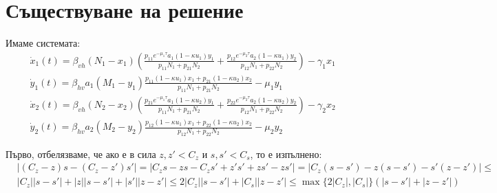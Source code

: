 \section{Съществуване на решение}
Имаме системата:
\begin{align*}
  &\dot{x}_1(t) = \beta_{vh} (N_1-x_1) \left(\frac{p_{11} e^{-\mu_1 \tau} a_1 (1-\kappa u_1) y_1}{p_{11} N_1 + p_{21} N_2} + \frac{p_{12} e^{-\mu_2 \tau} a_2 (1-\kappa u_1) y_2}{p_{12} N_1 + p_{22} N_2 }\right) - \gamma_1 x_1 \\
  &\dot{y}_1(t) = \beta_{hv} a_1 (M_1-y_1) \frac{p_{11} (1-\kappa u_1) x_1 + p_{21} (1-\kappa u_2) x_2}{p_{11} N_1 + p_{21} N_2} - \mu_1 y_1 \\
  &\dot{x}_2(t) = \beta_{vh} (N_2-x_2) \left(\frac{p_{21} e^{-\mu_1 \tau} a_1 (1-\kappa u_2) y_1}{p_{11} N_1 + p_{21} N_2 } + \frac{p_{22} e^{-\mu_2 \tau} a_2 (1-\kappa u_2) y_2}{p_{12} N_1 + p_{22} N_2}\right) - \gamma_2 x_2 \\
  &\dot{y}_2(t) = \beta_{hv} a_2 (M_2-y_2) \frac{p_{12} (1-\kappa u_1) x_1 +p_{22} (1-\kappa u_2) x_2}{p_{12} N_1 + p_{22} N_2} - \mu_2 y_2
\end{align*}

Първо, отбелязваме, че ако е в сила $z, z' < C_z$ и $s, s' < C_s$, то е изпълнено:
\begin{align*}
  &|(C_z - z) s - (C_z - z') s'| =
  |C_z s - z s - C_z s' + z' s' + z s' - z s'| =
  |C_z (s - s') - z (s - s') - s' (z - z')| \leq \\
  &|C_z| |s - s'| + |z| |s - s'| + |s'| |z - z'| \leq
  2 |C_z| |s - s'|  + |C_s| |z - z'| \leq
  \max\{2 |C_z|, |C_s|\} (|s-s'| + |z - z'|)
\end{align*}

